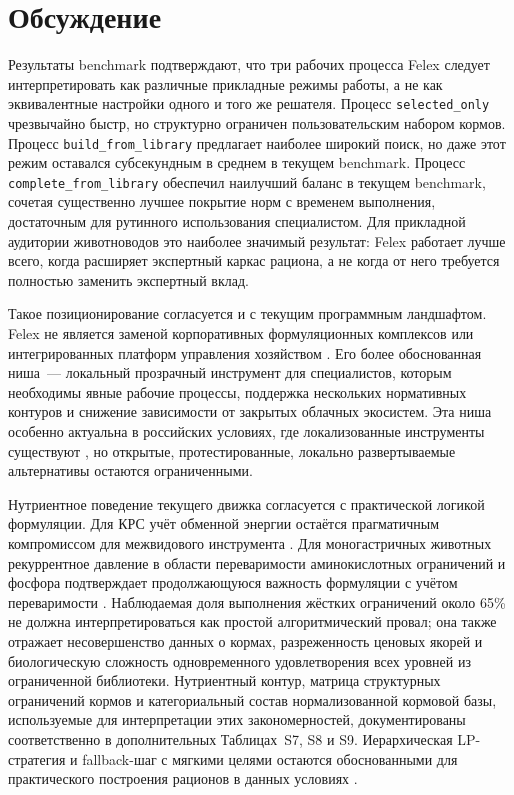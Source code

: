 \documentclass[a4paper,fleqn]{cas-sc}
\begin{document}
\section{Обсуждение}\label{sec:discussion}

Результаты benchmark подтверждают, что три рабочих процесса Felex следует интерпретировать как различные прикладные режимы работы, а не как эквивалентные настройки одного и того же решателя. Процесс \texttt{selected\_only} чрезвычайно быстр, но структурно ограничен пользовательским набором кормов. Процесс \texttt{build\_from\_library} предлагает наиболее широкий поиск, но даже этот режим оставался субсекундным в среднем в текущем benchmark. Процесс \texttt{complete\_from\_library} обеспечил наилучший баланс в текущем benchmark, сочетая существенно лучшее покрытие норм с временем выполнения, достаточным для рутинного использования специалистом. Для прикладной аудитории животноводов это наиболее значимый результат: Felex работает лучше всего, когда расширяет экспертный каркас рациона, а не когда от него требуется полностью заменить экспертный вклад.

Такое позиционирование согласуется и с текущим программным ландшафтом. Felex не является заменой корпоративных формуляционных комплексов или интегрированных платформ управления хозяйством \citep{datacor2026, korall2026, onecow2026}. Его более обоснованная ниша~--- локальный прозрачный инструмент для специалистов, которым необходимы явные рабочие процессы, поддержка нескольких нормативных контуров и снижение зависимости от закрытых облачных экосистем. Эта ниша особенно актуальна в российских условиях, где локализованные инструменты существуют \citep{deltakorm2026, winmix2026}, но открытые, протестированные, локально развертываемые альтернативы остаются ограниченными.

Нутриентное поведение текущего движка согласуется с практической логикой формуляции. Для КРС учёт обменной энергии остаётся прагматичным компромиссом для межвидового инструмента \citep{inra2018, volden2011, kalashnikov2003}. Для моногастричных животных рекуррентное давление в области переваримости аминокислотных ограничений и фосфора подтверждает продолжающуюся важность формуляции с учётом переваримости \citep{stein2007, nRC2012, pomar2021, deLange2012, vanmilgen2015}. Наблюдаемая доля выполнения жёстких ограничений около 65\% не должна интерпретироваться как простой алгоритмический провал; она также отражает несовершенство данных о кормах, разреженность ценовых якорей и биологическую сложность одновременного удовлетворения всех уровней из ограниченной библиотеки. Нутриентный контур, матрица структурных ограничений кормов и категориальный состав нормализованной кормовой базы, используемые для интерпретации этих закономерностей, документированы соответственно в дополнительных Таблицах~S7, S8 и S9. Иерархическая LP-стратегия и fallback-шаг с мягкими целями остаются обоснованными для практического построения рационов в данных условиях \citep{rehman1987}.
\end{document}

